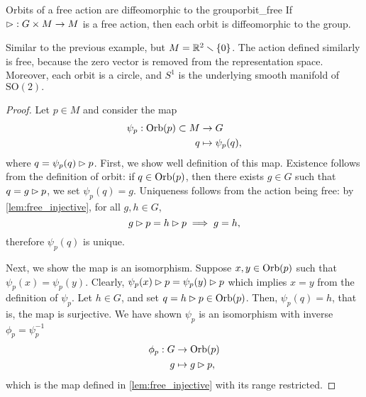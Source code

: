 \begin{theorem}{Orbits of a free action are diffeomorphic to the group}{orbit_free}
    If \(\mathbin{\vartriangleright} : G \times M \to M\) is a free action, then each orbit is diffeomorphic to the group.
\end{theorem}
\begin{example}
    Similar to the previous example, but \(M = \mathbb{R}^2 \smallsetminus \{0\}\). The action defined similarly is free, because the zero vector is removed from the representation space. Moreover, each orbit is a circle, and \(S^1\) is the underlying smooth manifold of \(\mathrm{SO}(2).\)
\end{example}
\begin{proof}
    Let \(p \in M\) and consider the map
    \begin{align*}
        \psi_p : \operatorname{Orb}(p) \subset M &\to G\\
                             q &\mapsto \psi_p(q),
    \end{align*}
    where \(q = \psi_p(q) \mathbin{\vartriangleright} p\). First, we show well definition of this map. Existence follows from the definition of orbit: if \(q \in \operatorname{Orb}(p)\), then there exists \(g \in G\) such that \(q = g \mathbin{\vartriangleright} p\), we set \(\psi_p(q) = g\). Uniqueness follows from the action being free: by \cref{lem:free_injective}, for all \(g, h \in G\),
    \begin{equation*}
        g \mathbin{\vartriangleright} p = h \mathbin{\vartriangleright} p \implies g = h,
    \end{equation*}
    therefore \(\psi_p(q)\) is unique.

    Next, we show the map is an isomorphism. Suppose \(x,y \in \operatorname{Orb}(p)\) such that \(\psi_p(x) = \psi_p(y)\). Clearly, \(\psi_p(x) \mathbin{\vartriangleright} p = \psi_p(y) \mathbin{\vartriangleright} p\) which implies \(x = y\) from the definition of \(\psi_p\). Let \(h \in G\), and set \(q = h \mathbin{\vartriangleright} p \in \operatorname{Orb}(p)\). Then, \(\psi_p(q) = h\), that is, the map is surjective. We have shown \(\psi_p\) is an isomorphism with inverse \(\phi_p = \psi_p^{-1}\)
    \begin{align*}
        \phi_p : G &\to \operatorname{Orb}(p)\\
                 g &\mapsto g \mathbin{\vartriangleright} p,
    \end{align*}
    which is the map defined in \cref{lem:free_injective} with its range restricted.

\end{proof}

